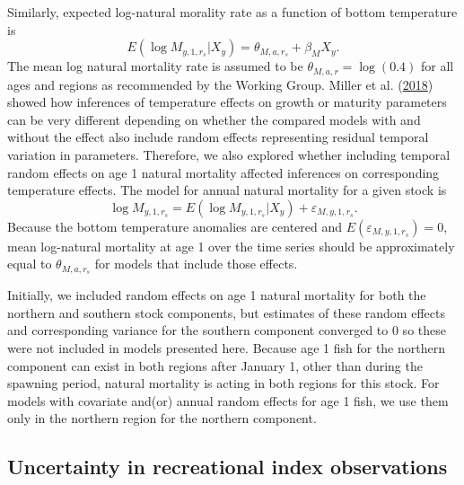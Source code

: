 \documentclass[
]{article}
\begin{document}
Similarly, expected log-natural morality rate as a function of bottom temperature is
\begin{equation}\label{eq:expected-M1}
E\left(\log M_{y,1,r_s}|X_y\right) = \theta_{M,a,r_s} + \beta_{M} X_y.
\end{equation}
The mean log natural mortality rate is assumed to be \(\theta_{M,a,r} = \log(0.4)\) for all ages and regions as recommended by the Working Group. Miller et al. (\protect\hyperlink{ref-milleretal18}{2018}) showed how inferences of temperature effects on growth or maturity parameters can be very different depending on whether the compared models with and without the effect also include random effects representing residual temporal variation in parameters. Therefore, we also explored whether including temporal random effects on age 1 natural mortality affected inferences on corresponding temperature effects. The model for annual natural mortality for a given stock is
\begin{equation}\label{eq:M-re}
\log M_{y,1,r_s} = E\left(\log M_{y,1,r_s}|X_y\right) + \varepsilon_{M,y,1,r_s}.
\end{equation}
Because the bottom temperature anomalies are centered and \(E(\varepsilon_{M,y,1,r_s}) = 0\), mean log-natural mortality at age 1 over the time series should be approximately equal to \(\theta_{M,a,r_s}\) for models that include those effects.

Initially, we included random effects on age 1 natural mortality for both the northern and southern stock components, but estimates of these random effects and corresponding variance for the southern component converged to 0 so these were not included in models presented here. Because age 1 fish for the northern component can exist in both regions after January 1, other than during the spawning period, natural mortality is acting in both regions for this stock. For models with covariate and(or) annual random effects for age 1 fish, we use them only in the northern region for the northern component.

\hypertarget{uncertainty-in-recreational-index-observations}{%
\subsection*{Uncertainty in recreational index observations}\label{uncertainty-in-recreational-index-observations}}
\end{document}
